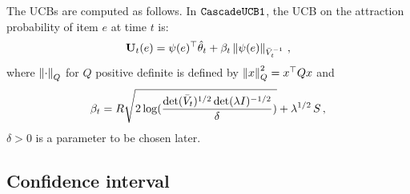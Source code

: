 %
The UCBs are computed as follows. In ${\tt CascadeUCB1}$, the UCB on the attraction probability of item $e$ at time $t$ is:
\begin{align*}
  \mathbf{U}_t(e) = \psi(e)^\top \hat{\mathbf{\theta}}_t + \beta_t \left\|\psi(e) \right\|_{\bar{V}_t^{-1}}\,,
\end{align*}
where $\left\|\cdot\right\|_Q$ for $Q$ positive definite is defined by
$\left\|x\right\|^2_Q  = x^\top Q x$ and
\[
\beta_t = R \sqrt{2 \log( \frac{\det (\bar{V}_{t})^{1/2}\det(\lambda I)^{-1/2}}{\delta} )} + \lambda^{1/2}\, S\,,
\]
$\delta>0$ is a parameter to be chosen later.

\subsection{Confidence interval}

